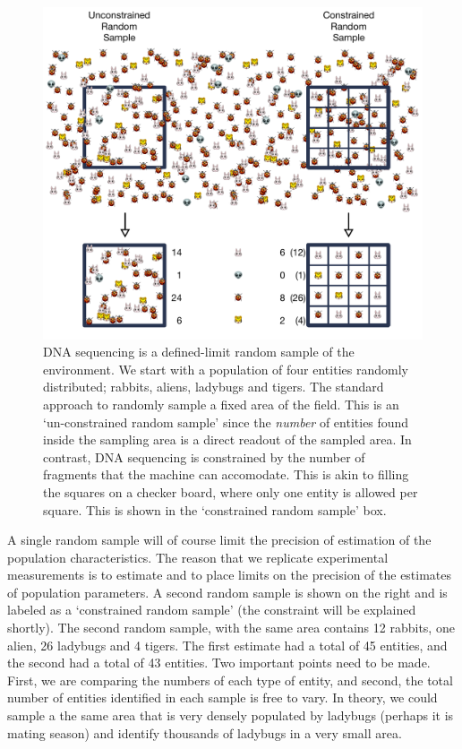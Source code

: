 \documentclass[onecolumn]{book}
\theoremstyle{definition}
\theoremstyle{definition}
\theoremstyle{definition}
\theoremstyle{remark}
\begin{document}
\begin{figure}
\centering
\includegraphics{figs/RALT.pdf}
\caption{\label{RALT} DNA sequencing is a defined-limit random sample of
the environment. We start with a population of four entities randomly
distributed; rabbits, aliens, ladybugs and tigers. The standard approach
to randomly sample a fixed area of the field. This is an `un-constrained
random sample' since the \emph{number} of entities found inside the
sampling area is a direct readout of the sampled area. In contrast, DNA
sequencing is constrained by the number of fragments that the machine
can accomodate. This is akin to filling the squares on a checker board,
where only one entity is allowed per square. This is shown in the
`constrained random sample' box.}
\end{figure}

A single random sample will of course limit the precision of estimation
of the population characteristics. The reason that we replicate
experimental measurements is to estimate and to place limits on the
precision of the estimates of population parameters. A second random
sample is shown on the right and is labeled as a `constrained random
sample' (the constraint will be explained shortly). The second random
sample, with the same area contains 12 rabbits, one alien, 26 ladybugs
and 4 tigers. The first estimate had a total of 45 entities, and the
second had a total of 43 entities. Two important points need to be made.
First, we are comparing the numbers of each type of entity, and second,
the total number of entities identified in each sample is free to vary.
In theory, we could sample a the same area that is very densely
populated by ladybugs (perhaps it is mating season) and identify
thousands of ladybugs in a very small area.
\end{document}
